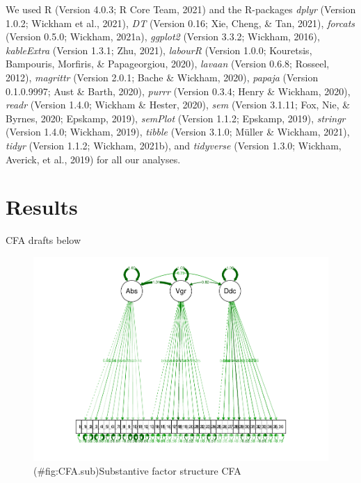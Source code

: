 \documentclass[
  english,
  man]{apa6}
\begin{document}
We used R (Version 4.0.3; R Core Team, 2021) and the R-packages \emph{dplyr} (Version 1.0.2; Wickham et al., 2021), \emph{DT} (Version 0.16; Xie, Cheng, \& Tan, 2021), \emph{forcats} (Version 0.5.0; Wickham, 2021a), \emph{ggplot2} (Version 3.3.2; Wickham, 2016), \emph{kableExtra} (Version 1.3.1; Zhu, 2021), \emph{labourR} (Version 1.0.0; Kouretsis, Bampouris, Morfiris, \& Papageorgiou, 2020), \emph{lavaan} (Version 0.6.8; Rosseel, 2012), \emph{magrittr} (Version 2.0.1; Bache \& Wickham, 2020), \emph{papaja} (Version 0.1.0.9997; Aust \& Barth, 2020), \emph{purrr} (Version 0.3.4; Henry \& Wickham, 2020), \emph{readr} (Version 1.4.0; Wickham \& Hester, 2020), \emph{sem} (Version 3.1.11; Fox, Nie, \& Byrnes, 2020; Epskamp, 2019), \emph{semPlot} (Version 1.1.2; Epskamp, 2019), \emph{stringr} (Version 1.4.0; Wickham, 2019), \emph{tibble} (Version 3.1.0; Müller \& Wickham, 2021), \emph{tidyr} (Version 1.1.2; Wickham, 2021b), and \emph{tidyverse} (Version 1.3.0; Wickham, Averick, et al., 2019) for all our analyses.

\hypertarget{results}{%
\section{Results}\label{results}}

CFA drafts below

\begin{figure}
\centering
\includegraphics{SIOPpapaja_files/figure-latex/CFA.sub-1.pdf}
\caption{(\#fig:CFA.sub)Substantive factor structure CFA}
\end{figure}
\end{document}
